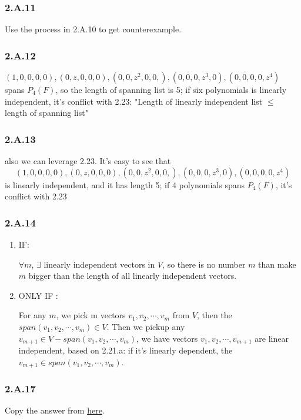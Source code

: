 \subsubsection*{2.A.11}

Use the process in 2.A.10 to get counterexample.

\subsubsection*{2.A.12}

$(1, 0, 0, 0, 0), (0, z, 0,0,0), (0,0,z^{2},0,0,),(0,0,0,z^{3},0),(0,0,0,0,z^{4})$ spans $P_{4}(F)$, so the length of spanning list is 5; if six polynomials is linearly independent, it's conflict with 2.23: "Length of linearly independent list $\leq$ length of spanning list"

\subsubsection*{2.A.13}

also we can leverage 2.23. It's easy to see that
\[(1, 0, 0, 0, 0), (0, z, 0,0,0), (0,0,z^{2},0,0,),(0,0,0,z^{3},0),(0,0,0,0,z^{4})\]
is linearly independent, and it has length 5; if 4 polynomials spans $P_{4}(F)$, it's conflict with 2.23

\subsubsection*{2.A.14}
\begin{enumerate}[label=(\alph*)]
\item IF:

$\forall m$, $\exists $ linearly independent vectors in $V$, so there is no number $m$ than make $m$ bigger than the length of all linearly independent vectors. 
\item ONLY IF :

For any $m$, we pick m vectors $v_{1}, v_{2}, \cdots, v_{m}$ from $V$, then the $span(v_{1}, v_{2},\cdots,v_{m})\in V$. Then we pickup any $v_{m+1}\in V-span(v_{1}, v_{2},\cdots,v_{m})$, we have vectors $v_{1}, v_{2}, \cdots, v_{m+1}$ are linear independent, based on 2.21.a: if it's linearly dependent, the $v_{m+1}\in span(v_{1}, v_{2},\cdots,v_{m})$.
\end{enumerate}

\subsubsection*{2.A.17}
Copy the answer from \href{https://linearalgebras.com/2a.html}{here}.


